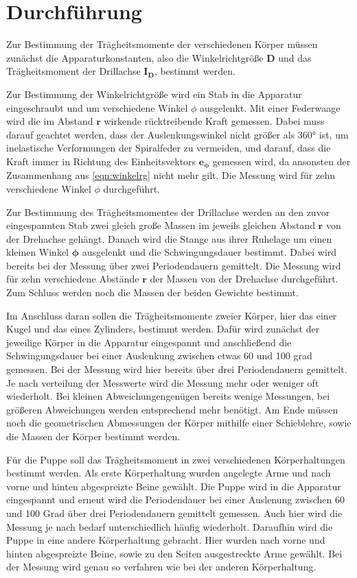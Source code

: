 \section{Durchführung}
\label{sec:Durchführung}

Zur Bestimmung der Trägheitsmomente der verschiedenen Körper müssen zunächst die
Apparaturkonstanten, also die Winkelrichtgröße $\symbf{D}$ und das Trägheitsmoment
der Drillachse $\symbf{I_D}$, bestimmt werden.

Zur Bestimmung der Winkelrichtgröße wird ein Stab in die Apparatur eingeschraubt und
um verschiedene Winkel $\phi$ ausgelenkt. Mit einer Federwaage wird die im Abstand
$\symbf{r}$ wirkende rücktreibende Kraft gemessen. Dabei muss darauf geachtet werden,
dass der Auslenkungswinkel nicht größer als 360° ist, um inelastische Verformungen der
Spiralfeder zu vermeiden, und darauf, dass die Kraft immer in Richtung des Einheitsvektors
$\symbf{e_{\phi}}$ gemessen wird, da ansonsten der Zusammenhang aus \eqref{eqn:winkelrg}
nicht mehr gilt. Die Messung wird für zehn verschiedene Winkel $\phi$ durchgeführt.

Zur Bestimmung des Trägheitsmomentes der Drillachse werden an den zuvor eingespannten
Stab zwei gleich große Massen im jeweils gleichen Abstand $\symbf{r}$ von der
Drehachse gehängt. Danach wird die Stange aus ihrer Ruhelage um einen kleinen Winkel
$\symbf{\phi}$ ausgelenkt und die Schwingungsdauer bestimmt. Dabei wird bereits bei
der Messung über zwei Periodendauern gemittelt. Die Messung wird für zehn verschiedene
Abstände $\symbf{r}$ der Massen von der Drehachse durchgeführt. Zum Schluss werden
noch die Massen der beiden Gewichte bestimmt.

Im Anschluss daran sollen die Trägheitsmomente zweier Körper, hier das einer Kugel und
das eines Zylinders, bestimmt werden. Dafür wird zunächst der jeweilige Körper in
die Apparatur eingespannt und anschließend die Schwingungsdauer bei einer Auslenkung
zwischen etwas 60 und 100 grad gemessen. Bei der Messung wird hier bereits über drei
Periodendauern gemittelt. Je nach verteilung der Messwerte wird die Messung mehr
oder weniger oft wiederholt. Bei kleinen Abweichungengenügen bereits wenige Messungen,
bei größeren Abweichungen werden entsprechend mehr benötigt. Am Ende müssen noch die
geometrischen Abmessungen der Körper mithilfe einer Schieblehre, sowie die Massen der
Körper bestimmt werden.

Für die Puppe soll das Trägheitsmoment in zwei verschiedenen Körperhaltungen bestimmt
werden. Als erste Körperhaltung wurden angelegte Arme und nach vorne und hinten
abgespreizte Beine gewählt. Die Puppe wird in die Apparatur eingespannt und erneut
wird die Periodendauer bei einer Auslenung zwischen 60 und 100 Grad über drei
Periodendauern gemittelt gemessen. Auch hier wird die Messung je nach bedarf
unterschiedlich häufig wiederholt. Daraufhin wird die Puppe in eine andere
Körperhaltung gebracht. Hier wurden nach vorne und hinten abgespreizte Beine,
sowie zu den Seiten ausgestreckte Arme gewählt. Bei der Messung wird genau so
verfahren wie bei der anderen Körperhaltung.
